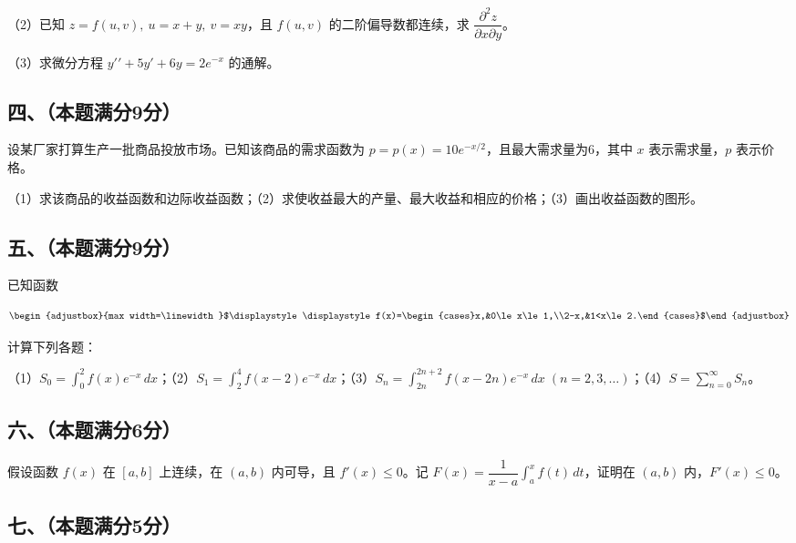 \documentclass[UTF8,12pt]{ctexart}
\newcommand{\fitmath}[1]{\begin{adjustbox}{max width=\linewidth}$\displaystyle #1$\end{adjustbox}}
\begin{document}
（2）已知 \(\displaystyle z=f(u,\allowbreak v),\allowbreak \ u=x+y,\allowbreak \ v=xy\)，且 \(\displaystyle f(u,\allowbreak v)\) 的二阶偏导数都连续，求 \(\displaystyle \dfrac{\displaystyle \partial^2z}{\displaystyle \partial x\partial y}\)。


（3）求微分方程 \(\displaystyle y\prime\prime+5y\prime+6y=2e^{-x}\) 的通解。


\subsection*{四、（本题满分9分）}

设某厂家打算生产一批商品投放市场。已知该商品的需求函数为 \(\displaystyle p=p(x)=10e^{-x/2}\)，且最大需求量为6，其中 \(\displaystyle x\) 表示需求量，\(\displaystyle p\) 表示价格。


（1）求该商品的收益函数和边际收益函数；（2）求使收益最大的产量、最大收益和相应的价格；（3）画出收益函数的图形。


\subsection*{五、（本题满分9分）}

已知函数


\[\fitmath{\displaystyle f(x)=\begin{cases}x,&0\le x\le1,\\2-x,&1<x\le2.\end{cases}}\]


计算下列各题：


（1）\(\displaystyle S_0=\displaystyle \int_0^2f(x)e^{-x}\,dx\)；（2）\(\displaystyle S_1=\displaystyle \int_2^4f(x-2)e^{-x}\,dx\)；（3）\(\displaystyle S_n=\displaystyle \int_{2n}^{2n+2}f(x-2n)e^{-x}\,dx\;(n=2,\allowbreak 3,\allowbreak \ldots)\)；（4）\(\displaystyle S=\displaystyle \sum_{n=0}^{\infty}S_n\)。


\subsection*{六、（本题满分6分）}

假设函数 \(\displaystyle f(x)\) 在 \(\displaystyle [a,\allowbreak b]\) 上连续，在 \(\displaystyle (a,\allowbreak b)\) 内可导，且 \(\displaystyle f\prime(x)\le0\)。记 \(\displaystyle F(x)=\dfrac{\displaystyle 1}{\displaystyle x-a}\displaystyle \int_a^x f(t)\,dt\)，证明在 \(\displaystyle (a,\allowbreak b)\) 内，\(\displaystyle F\prime(x)\le0\)。


\subsection*{七、（本题满分5分）}
\end{document}
